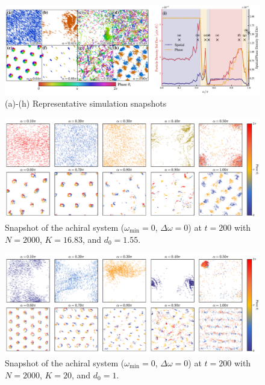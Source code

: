 \documentclass{article}
\begin{document}
\begin{figure}[H]
    \centering
    \includegraphics[width=\textwidth]{./figs/snapshotsAndPhaseDiagram.pdf}
    \caption{
        (a)-(h) Representative simulation snapshots 
    }
\end{figure}

\begin{figure}[H]
    \centering
    \includegraphics[width=\textwidth]{./figs/snapshot_v_alpha_K16.83_d01.55.pdf}
    \caption{
        Snapshot of the achiral system ($\omega _{\min}=0$, $\Delta \omega=0$) at $t=200$ with $N=2000$, $K=16.83$, and $d_0=1.55$.
    }
\end{figure}

\begin{figure}[H]
    \centering
    \includegraphics[width=\textwidth]{./figs/snapshot_v_alpha_K20.00_d01.00.pdf}
    \caption{
        Snapshot of the achiral system ($\omega _{\min}=0$, $\Delta \omega=0$) at $t=200$ with $N=2000$, $K=20$, and $d_0=1$.
    }
\end{figure}
\end{document}
